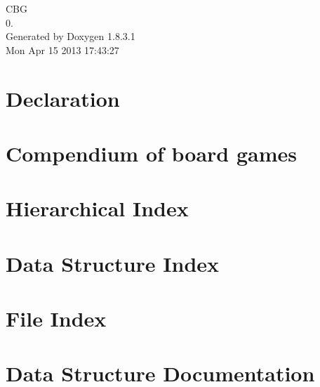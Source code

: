 \documentclass{book}
\begin{document}
\hypersetup{pageanchor=false,citecolor=blue}
\begin{titlepage}
\vspace*{7cm}
\begin{center}
{\Large C\-B\-G \\[1ex]\large 0. }\\
\vspace*{1cm}
{\large Generated by Doxygen 1.8.3.1}\\
\vspace*{0.5cm}
{\small Mon Apr 15 2013 17:43:27}\\
\end{center}
\end{titlepage}
\clearemptydoublepage
{}
\tableofcontents
\clearemptydoublepage
{}
\hypersetup{pageanchor=true,citecolor=blue}
\chapter{Declaration}
\label{md_DECLARATION}
\hypertarget{md_DECLARATION}{}

\chapter{Compendium of board games}
\label{md_README}
\hypertarget{md_README}{}

\chapter{Hierarchical Index}

\chapter{Data Structure Index}

\chapter{File Index}

\chapter{Data Structure Documentation}













\end{document}

